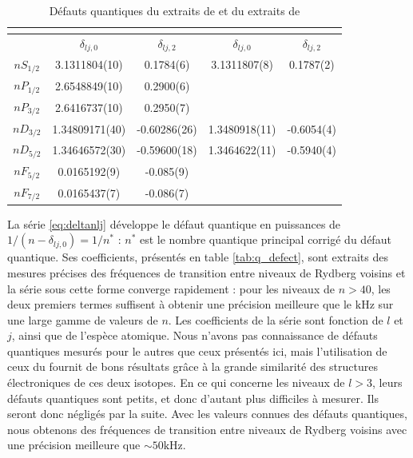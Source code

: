 \begin{table}[tph!]
	\centering
	\caption[Défauts quantiques du $^{87}Rb$ et $^{85}Rb$]{Défauts quantiques  du  extraits de \cite{MX_GALLAGHERSPECRBNSND03, MX_GALLAGHERSPECRBNF06} et du  extraits de \cite{MX_MACKNSNDRYD}}
	\label{tab:q_defect}
	\begin{tabular}{ c S[table-format=1.12]S[table-format=2.8]  S[table-format=1.10]S[table-format=2.6]}
		\toprule\midrule
		 &  	&     \\ 
		 \midrule
				  &		$\delta_{lj,0}$				&	$\delta_{lj,2}$		&	$\delta_{lj,0}$			&	$\delta_{lj,2}$ \\ 
		\midrule
		$nS_{1/2}$&  	3.1311804(10)		&	0.1784(6) 	& 3.1311807(8)	& 0.1787(2)	\\
		$nP_{1/2}$&  	2.6548849(10)		&	0.2900(6)	&						&				\\
		$nP_{3/2}$&  	2.6416737(10)		&	0.2950(7)	&						&				\\
		$nD_{3/2}$&  	1.34809171(40)	&	-0.60286(26)&1.3480918(11)	&	-0.6054(4)	\\
		$nD_{5/2}$&  	1.34646572(30)	&	-0.59600(18)&1.3464622(11)	&-0.5940(4)		\\
		$nF_{5/2}$&  	0.0165192(9)		&	-0.085(9)	&						&				\\
		$nF_{7/2}$&  	0.0165437(7)		&	-0.086(7)	&						&				\\
		\midrule
		\bottomrule
 	\end{tabular}
\end{table}
%
La série \eqref{eq:deltanlj} développe le défaut quantique en puissances de $1/(n-\delta_{lj,0}) = 1/n^*$ : $n^*$ est le nombre quantique principal corrigé du défaut quantique.
Ses coefficients, présentés en table \eqref{tab:q_defect}, sont extraits des mesures précises des fréquences de transition entre niveaux de Rydberg voisins \cite{ENS_SPECNA2,ENS_SPECCS,MX_MECHEDERYDSPECTRO87} et la série sous cette forme converge rapidement \cite{MX_MARTINSERIESSPECNA} :
pour les niveaux de $n>40$, les deux premiers termes suffisent à obtenir une précision meilleure que le $\si{\kilo\hertz}$ sur une large gamme de valeurs de $n$.
Les coefficients de la série sont fonction de $l$ et $j$, ainsi que de l'espèce atomique.
Nous n'avons pas connaissance de défauts quantiques mesurés pour le  autres que ceux présentés ici, mais l'utilisation de ceux du  fournit de bons résultats grâce à la grande similarité des structures électroniques de ces deux isotopes.
En ce qui concerne les niveaux de $l>3$, leurs défauts quantiques sont petits, et donc d'autant plus difficiles à mesurer. Ils seront donc négligés par la suite.
Avec les valeurs connues des défauts quantiques, nous obtenons des fréquences de transition entre niveaux de Rydberg voisins avec une précision meilleure que $\sim 50\si{\kilo\hertz}$.

